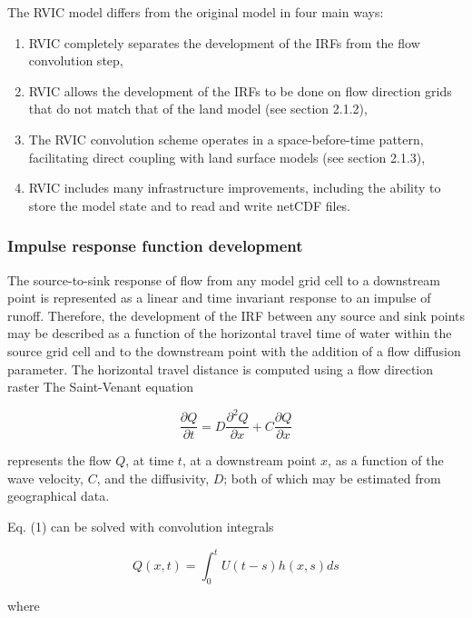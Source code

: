 \documentclass[ms, draft]{agutex}
\begin{document}
\begin{article}
The RVIC model differs from the original \citet{Lohmann_1996} model in four main ways:

\begin{enumerate}
\item RVIC completely separates the development of the IRFs from the flow convolution step,
\item RVIC allows the development of the IRFs to be done on flow direction grids that do not match that of the land model (see section 2.1.2),
\item The RVIC convolution scheme operates in a space-before-time pattern, facilitating direct coupling with land surface models (see section 2.1.3),
\item RVIC includes many infrastructure improvements, including the ability to store the model state and to read and write netCDF files.
\end{enumerate}

\subsubsection{Impulse response function development}

The source-to-sink response of flow from any model grid cell to a downstream point is represented as a linear and time invariant response to an impulse of runoff.
Therefore, the development of the IRF between any source and sink points may be described as a function of the horizontal travel time of water within the source grid cell and to the downstream point with the addition of a flow diffusion parameter.
The horizontal travel distance is computed using a flow direction raster \citep[e.g.][]{Wu_2011}
The Saint-Venant equation

 \begin{equation}
     \frac{\partial Q}{\partial t} = D \frac{\partial^2 Q}{\partial x} + C \frac{\partial Q}{\partial x}
 \end{equation}

represents the flow $Q$, at time $t$, at a downstream point $x$, as a function of the wave velocity, $C$, and the diffusivity, $D$; both of which may be estimated from geographical data.

Eq. (1) can be solved with convolution integrals

 \begin{equation}
	Q(x,t) = \int_0^t U(t-s)h(x,s)ds
 \end{equation}

where


\end{article}
\end{document}
